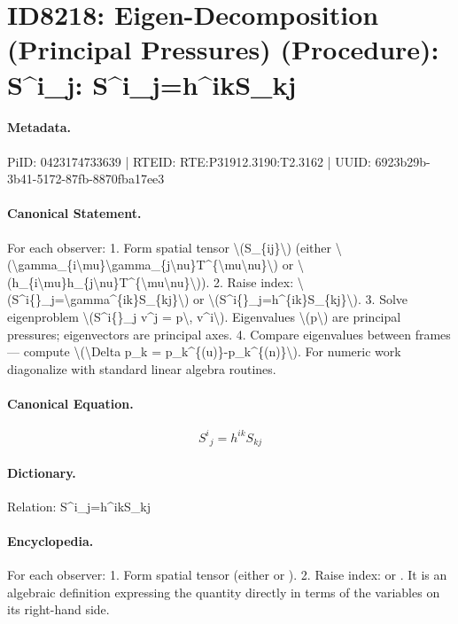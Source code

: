 \section*{ID8218: Eigen-Decomposition (Principal Pressures) (Procedure): S\textasciicircum{}i\_j: S\textasciicircum{}i\_j=h\textasciicircum{}ikS\_kj}
\paragraph{Metadata.}
PiID: 0423174733639 | RTEID: RTE:P31912.3190:T2.3162 | UUID: 6923b29b-3b41-5172-87fb-8870fba17ee3

\paragraph{Canonical Statement.}
For each observer: 1. Form spatial tensor \textbackslash{}(S\_\{ij\}\textbackslash{}) (either \textbackslash{}(\textbackslash{}gamma\_\{i\textbackslash{}mu\}\textbackslash{}gamma\_\{j\textbackslash{}nu\}T\textasciicircum{}\{\textbackslash{}mu\textbackslash{}nu\}\textbackslash{}) or \textbackslash{}(h\_\{i\textbackslash{}mu\}h\_\{j\textbackslash{}nu\}T\textasciicircum{}\{\textbackslash{}mu\textbackslash{}nu\}\textbackslash{})). 2. Raise index: \textbackslash{}(S\textasciicircum{}i\{\}\_j=\textbackslash{}gamma\textasciicircum{}\{ik\}S\_\{kj\}\textbackslash{}) or \textbackslash{}(S\textasciicircum{}i\{\}\_j=h\textasciicircum{}\{ik\}S\_\{kj\}\textbackslash{}). 3. Solve eigenproblem \textbackslash{}(S\textasciicircum{}i\{\}\_j v\textasciicircum{}j = p\textbackslash{}, v\textasciicircum{}i\textbackslash{}). Eigenvalues \textbackslash{}(p\textbackslash{}) are principal pressures; eigenvectors are principal axes. 4. Compare eigenvalues between frames — compute \textbackslash{}(\textbackslash{}Delta p\_k = p\_k\textasciicircum{}\{(u)\}-p\_k\textasciicircum{}\{(n)\}\textbackslash{}). For numeric work diagonalize with standard linear algebra routines.

\paragraph{Canonical Equation.}
\[
S^i{}_j=h^{ik}S_{kj}
\]

\paragraph{Dictionary.}
Relation: S\textasciicircum{}i\_j=h\textasciicircum{}ikS\_kj

\paragraph{Encyclopedia.}
For each observer: 1. Form spatial tensor (either or ). 2. Raise index: or . It is an algebraic definition expressing the quantity directly in terms of the variables on its right-hand side.
